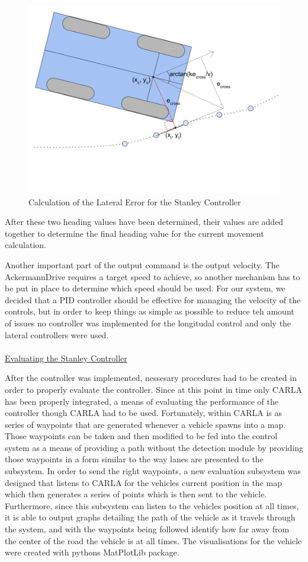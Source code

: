 \documentclass[titlepage]{article}
\begin{document}
{\begin{figure}
	\centering
	\includegraphics[width=5in]{stanley_lateral_error}
	\caption{Calculation of the Lateral Error for the Stanley Controller}
	\label{fig:stanley_lateral_calc}
\end{figure}

After these two heading values have been determined, their values are added together to determine the final heading value for the current movement calculation.

Another important part of the output command is the output velocity. The AckermannDrive requires a target speed to achieve, so another mechanism has to be put in place to determine which speed should be used. For our system, we decided that a PID controller should be effective for managing the velocity of the controls, but in order to keep things as simple as possible to reduce teh amount of issues no controller was implemented for the longitudal control and only the lateral controllers were used.\\~\\
\underline{Evaluating the Stanley Controller}

After the controller was implemented, nessesary procedures had to be created in order to properly evaluate the controller. Since at this point in time only CARLA has been properly integrated, a means of evaluating the performance of the controller though CARLA had to be used. Fortunately, within CARLA is as series of waypoints that are generated whenever a vehicle spawns into a map. Those waypoints can be taken and then modified to be fed into the control system as a means of providing a path without the detection module by providing those waypoints in a form similar to the way lanes are presented to the subsystem. In order to send the right waypoints, a new evaluation subsystem was designed that listens to CARLA for the vehicles current position in the map which then generates a series of points which is then sent to the vehicle. Furthermore, since this subsystem can listen to the vehicles position at all times, it is able to output graphs detailing the path of the vehicle as it travels through the system, and with the waypoints being followed identify how far away from the center of the road the vehicle is at all times. The visualisations for the vehicle were created with pythons MatPlotLib package.

}
\end{document}
